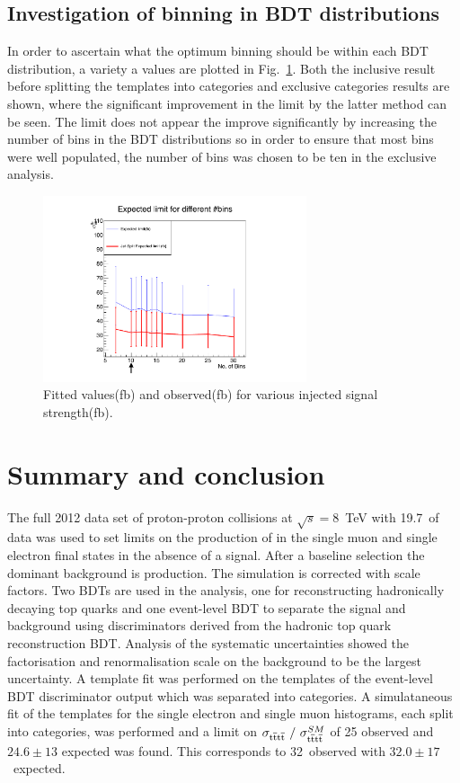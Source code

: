 \subsection{Investigation of binning in BDT distributions \label{appsub:binning}}

In order to ascertain what the optimum binning should be within each BDT distribution, a variety a values are plotted in Fig.~\ref{fig:Binning}. Both the inclusive result before splitting the templates into \njets categories and exclusive \njets categories results are shown, where the significant improvement in the limit by the latter method can be seen. The limit does not appear the improve significantly by increasing the number of bins in the BDT distributions so in order to ensure that most bins were well populated, the number of bins was chosen to be ten in the exclusive analysis.

\begin{figure}[ht!]
\centering
    \includegraphics[width=0.69\textwidth]{images/Run1/BinningPrint.pdf}
    \caption{Fitted values(fb) and observed(fb) for various injected signal strength(fb).}
    \label{fig:Binning}
\end{figure}

\section{Summary and conclusion}
\label{sec:summary8}
The full 2012 data set of proton-proton collisions at $\sqrt{s}=8$~TeV with 19.7~\fbinv of data was used to set limits on the production of \tttt in the single muon and single electron final states in the absence of a signal. After a baseline selection the dominant background is \ttbar production. The simulation is corrected with scale factors. Two BDTs are used in the analysis, one for reconstructing hadronically decaying top quarks and one event-level BDT to separate the signal and background using discriminators derived from the hadronic top quark reconstruction BDT. Analysis of the systematic uncertainties showed the factorisation and renormalisation scale on the \ttbar background to be the largest uncertainty. A template fit was performed on the templates of the event-level BDT discriminator output which was separated into \njets categories. A simulataneous fit of the templates for the single electron and single muon histograms, each split into \njets categories, was performed and a \CLS limit on $\sigma_{{\mathrm{t}\overline{\mathrm{t}}\mathrm{t}\overline{\mathrm{t}}}}~/~\sigma_{{\mathrm{t}\overline{\mathrm{t}}\mathrm{t}\overline{\mathrm{t}}}}^{SM} $ of 25 observed and $24.6\pm13$ expected was found. This corresponds to 32~\fb observed with $32.0\pm17$~\fb expected.

